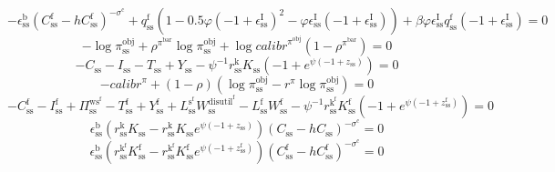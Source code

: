 \begin{equation}
-{\epsilon^{\mathrm{b}}_\mathrm{ss}} {\left(C^{\mathrm{f}}_\mathrm{ss} - {h} {C^{\mathrm{f}}_\mathrm{ss}}\right)^{-\sigma^{\mathrm{c}}}} + {q^{\mathrm{f}}_\mathrm{ss}} \left(1 - 0.5{\varphi} \left(-1 + \epsilon^{\mathrm{I}}_\mathrm{ss}\right)^{2} - {\varphi} {\epsilon^{\mathrm{I}}_\mathrm{ss}} \left(-1 + \epsilon^{\mathrm{I}}_\mathrm{ss}\right)\right) + {\beta} {\varphi} {\epsilon^{\mathrm{I}}_\mathrm{ss}} {q^{\mathrm{f}}_\mathrm{ss}} \left(-1 + \epsilon^{\mathrm{I}}_\mathrm{ss}\right) = 0
\end{equation}
\begin{equation}
-\log{\pi^{\mathrm{obj}}_\mathrm{ss}} + {\rho^{\pi^{\mathrm{bar}}}} {\log{\pi^{\mathrm{obj}}_\mathrm{ss}}} + {\log{{c\!a\!l\!i\!b\!r}^{\pi^{\mathrm{obj}}}}} \left(1 - \rho^{\pi^{\mathrm{bar}}}\right) = 0
\end{equation}
\begin{equation}
-C_\mathrm{ss} - I_\mathrm{ss} - T_\mathrm{ss} + Y_\mathrm{ss} - {\psi}^{-1} {r^{\mathrm{k}}_\mathrm{ss}} {K_\mathrm{ss}} \left(-1 + e^{{\psi} \left(-1 + z_\mathrm{ss}\right)}\right) = 0
\end{equation}
\begin{equation}
-{c\!a\!l\!i\!b\!r}^{\pi} + \left(1 - \rho\right) \left(\log{\pi^{\mathrm{obj}}_\mathrm{ss}} - {r^{\pi}} {\log{\pi^{\mathrm{obj}}_\mathrm{ss}}}\right) = 0
\end{equation}
\begin{equation}
-C^{\mathrm{f}}_\mathrm{ss} - I^{\mathrm{f}}_\mathrm{ss} + \Pi^{\mathrm{ws}^{\mathrm{f}}}_\mathrm{ss} - T^{\mathrm{f}}_\mathrm{ss} + Y^{\mathrm{f}}_\mathrm{ss} + {L^{\mathrm{s}^{\mathrm{f}}}_\mathrm{ss}} {W^{\mathrm{disutil}^{\mathrm{f}}}_\mathrm{ss}} - {L^{\mathrm{f}}_\mathrm{ss}} {W^{\mathrm{f}}_\mathrm{ss}} - {\psi}^{-1} {r^{\mathrm{k}^{\mathrm{f}}}_\mathrm{ss}} {K^{\mathrm{f}}_\mathrm{ss}} \left(-1 + e^{{\psi} \left(-1 + z^{\mathrm{f}}_\mathrm{ss}\right)}\right) = 0
\end{equation}
\begin{equation}
{\epsilon^{\mathrm{b}}_\mathrm{ss}} \left({r^{\mathrm{k}}_\mathrm{ss}} {K_\mathrm{ss}} - {r^{\mathrm{k}}_\mathrm{ss}} {K_\mathrm{ss}} {e^{{\psi} \left(-1 + z_\mathrm{ss}\right)}}\right) {\left(C_\mathrm{ss} - {h} {C_\mathrm{ss}}\right)^{-\sigma^{\mathrm{c}}}} = 0
\end{equation}
\begin{equation}
{\epsilon^{\mathrm{b}}_\mathrm{ss}} \left({r^{\mathrm{k}^{\mathrm{f}}}_\mathrm{ss}} {K^{\mathrm{f}}_\mathrm{ss}} - {r^{\mathrm{k}^{\mathrm{f}}}_\mathrm{ss}} {K^{\mathrm{f}}_\mathrm{ss}} {e^{{\psi} \left(-1 + z^{\mathrm{f}}_\mathrm{ss}\right)}}\right) {\left(C^{\mathrm{f}}_\mathrm{ss} - {h} {C^{\mathrm{f}}_\mathrm{ss}}\right)^{-\sigma^{\mathrm{c}}}} = 0
\end{equation}



